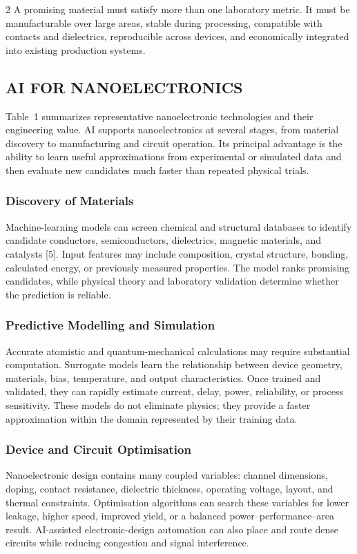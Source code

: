 \begin{multicols}{2}
  A promising material must satisfy more than one laboratory metric. It must be manufacturable over large areas, stable during processing, compatible with contacts and dielectrics, reproducible across devices, and economically integrated into existing production systems.

  \subsection*{\centering\uppercase{AI for Nanoelectronics}}
  Table~1 summarizes representative nanoelectronic technologies and their engineering value.
  AI supports nanoelectronics at several stages, from material discovery to manufacturing and circuit operation. Its principal advantage is the ability to learn useful approximations from experimental or simulated data and then evaluate new candidates much faster than repeated physical trials.

  \subsubsection*{Discovery of Materials}
  Machine-learning models can screen chemical and structural databases to identify candidate conductors, semiconductors, dielectrics, magnetic materials, and catalysts [5]. Input features may include composition, crystal structure, bonding, calculated energy, or previously measured properties. The model ranks promising candidates, while physical theory and laboratory validation determine whether the prediction is reliable.

  \subsubsection*{Predictive Modelling and Simulation}
  Accurate atomistic and quantum-mechanical calculations may require substantial computation. Surrogate models learn the relationship between device geometry, materials, bias, temperature, and output characteristics. Once trained and validated, they can rapidly estimate current, delay, power, reliability, or process sensitivity. These models do not eliminate physics; they provide a faster approximation within the domain represented by their training data.

  \subsubsection*{Device and Circuit Optimisation}
  Nanoelectronic design contains many coupled variables: channel dimensions, doping, contact resistance, dielectric thickness, operating voltage, layout, and thermal constraints. Optimisation algorithms can search these variables for lower leakage, higher speed, improved yield, or a balanced power--performance--area result. AI-assisted electronic-design automation can also place and route dense circuits while reducing congestion and signal interference.


\end{multicols}
